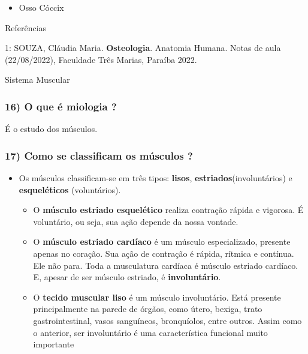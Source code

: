\documentclass[
]{book}
\providecommand{\tightlist}{%
  \setlength{\itemsep}{0pt}\setlength{\parskip}{0pt}}
\begin{document}
\begin{itemize}
\tightlist
\item
  Osso Cóccix
\end{itemize}

Referências

1: SOUZA, Cláudia Maria. \textbf{Osteologia}. Anatomia Humana. Notas de aula (22/08/2022), Faculdade Três Marias, Paraíba 2022.

Sistema Muscular

\hypertarget{o-que-uxe9-miologia}{%
\subsubsection*{16) O que é miologia ?}\label{o-que-uxe9-miologia}}

É o estudo dos músculos.

\hypertarget{como-se-classificam-os-muxfasculos}{%
\subsubsection*{17) Como se classificam os músculos ?}\label{como-se-classificam-os-muxfasculos}}

\begin{itemize}
\tightlist
\item
  Os músculos classificam-se em três tipos: \textbf{lisos}, \textbf{estriados}(involuntários) e \textbf{esqueléticos} (voluntários).

  \begin{itemize}
  \tightlist
  \item
    O \textbf{músculo estriado esquelético} realiza contração rápida e vigorosa. É voluntário, ou seja, sua ação depende da nossa vontade.
  \item
    O \textbf{músculo estriado cardíaco} é um músculo especializado, presente apenas no coração. Sua ação de contração é rápida, rítmica e contínua. Ele não para. Toda a musculatura cardíaca é músculo estriado cardíaco. E, apesar de ser músculo estriado, é \textbf{involuntário}.
  \item
    O \textbf{tecido muscular liso} é um músculo involuntário. Está presente principalmente na parede de órgãos, como útero, bexiga, trato gastrointestinal, vasos sanguíneos, bronquíolos, entre outros. Assim como o anterior, ser involuntário é uma característica funcional muito importante
  \end{itemize}
\end{itemize}
\end{document}
